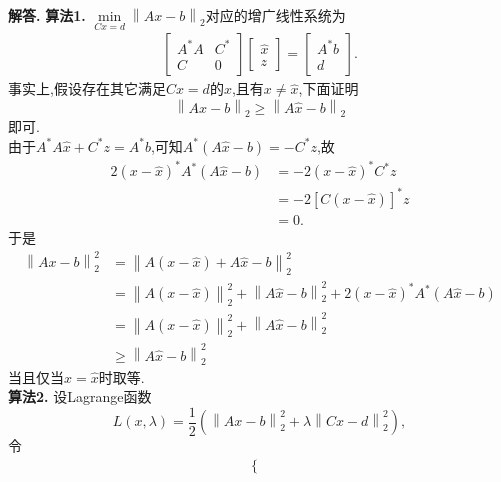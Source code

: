 \documentclass[12pt, a4paper, oneside, UTF8]{ctexart}
\newenvironment{solution}{\par\noindent\textbf{解答. }}{\par}
\begin{document}
\begin{solution}
    \textbf{算法1.} $\min\limits_{Cx=d}{\left\lVert{Ax-b}\right\rVert}_{2}$对应的增广线性系统为
    \begin{align*}
        \left[
            \begin{array}{cc}	
                A^*A & C^* \\
                C & 0
            \end{array}
        \right]
        \left[
            \begin{array}{cc}	
                \hat{x} \\
                z
            \end{array}
        \right]
        =
        \left[
            \begin{array}{cc}	
                A^*b \\
                d
            \end{array}
        \right].
    \end{align*}
    事实上,假设存在其它满足$Cx=d$的$x$,且有$x\neq\hat{x}$,下面证明
    $${\left\lVert{Ax-b}\right\rVert}_{2}\geqslant{\left\lVert{A\hat{x}-b}\right\rVert}_{2}$$即可.\\
    由于$A^*A\hat{x}+C^*z=A^*b$,可知$A^*(A\hat{x}-b)=-C^*z$,故
    \begin{align*}
        2(x-\hat{x})^*A^*(A\hat{x}-b)&=-2(x-\hat{x})^*C^*z\\
        &=-2[C(x-\hat{x})]^*z\\
        &=0.
    \end{align*}
    于是
    \begin{align*}
        {\left\lVert{Ax-b}\right\rVert}_{2}^{2}&={\left\lVert{A(x-\hat{x})+A\hat{x}-b}\right\rVert}_{2}^{2}\\
        &={\left\lVert{A(x-\hat{x})}\right\rVert}_{2}^{2}+{\left\lVert{A\hat{x}-b}\right\rVert}_{2}^{2}+2(x-\hat{x})^*A^*(A\hat{x}-b)\\
        &={\left\lVert{A(x-\hat{x})}\right\rVert}_{2}^{2}+{\left\lVert{A\hat{x}-b}\right\rVert}_{2}^{2}\\
        &\geqslant {\left\lVert{A\hat{x}-b}\right\rVert}_{2}^{2}
    \end{align*}
    当且仅当$x=\hat{x}$时取等.\\
    \textbf{算法2.} 设Lagrange函数
    $$L(x,\lambda) = \frac{1}{2}({\left\lVert{Ax-b}\right\rVert}_{2}^{2}+\lambda{\left\lVert{Cx-d}\right\rVert}_{2}^{2}),$$
    令
    \begin{align*}
        \left\{
            \begin{array}{ll}

\end{array}
\end{align*}
\end{solution}
\end{document}
